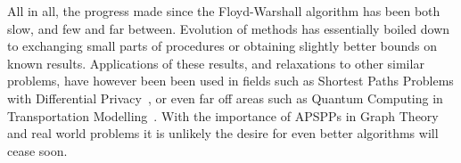 All in all, the progress made since the Floyd-Warshall algorithm has been both slow, and few and far between.
Evolution of methods has essentially boiled down to exchanging small parts of procedures or obtaining slightly better bounds on known results.
Applications of these results, and relaxations to other similar problems, have however been been used in fields such as Shortest Paths Problems with Differential Privacy~\cite{Chen2022}, or even far off areas such as Quantum Computing in Transportation Modelling~\cite{Cooper2022}.
With the importance of APSPPs in Graph Theory and real world problems it is unlikely the desire for even better algorithms will cease soon.
